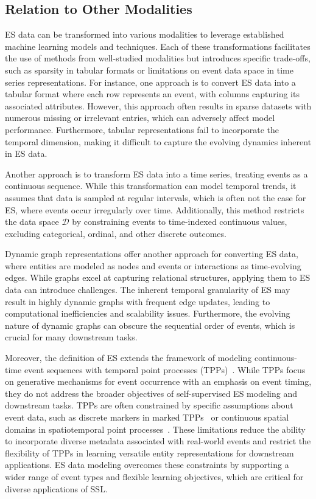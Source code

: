 \documentclass[twoside,11pt]{article}
\begin{document}
\subsection{Relation to Other Modalities}
\label{subsec:other-modality}
ES data can be transformed into various modalities to leverage established machine learning models and techniques. Each of these transformations facilitates the use of methods from well-studied modalities but introduces specific trade-offs, such as sparsity in tabular formats or limitations on event data space in time series representations. For instance, one approach is to convert ES data into a tabular format where each row represents an event, with columns capturing its associated attributes. However, this approach often results in sparse datasets with numerous missing or irrelevant entries, which can adversely affect model performance. Furthermore, tabular representations fail to incorporate the temporal dimension, making it difficult to capture the evolving dynamics inherent in ES data.

Another approach is to transform ES data into a time series, treating events as a continuous sequence. While this transformation can model temporal trends, it assumes that data is sampled at regular intervals, which is often not the case for ES, where events occur irregularly over time. Additionally, this method restricts the data space $\mathcal{D}$ by constraining events to time-indexed continuous values, excluding categorical, ordinal, and other discrete outcomes.

Dynamic graph representations offer another approach for converting ES data, where entities are modeled as nodes and events or interactions as time-evolving edges. While graphs excel at capturing relational structures, applying them to ES data can introduce challenges. The inherent temporal granularity of ES may result in highly dynamic graphs with frequent edge updates, leading to computational inefficiencies and scalability issues. Furthermore, the evolving nature of dynamic graphs can obscure the sequential order of events, which is crucial for many downstream tasks.

Moreover, the definition of ES extends the framework of modeling continuous-time event sequences with temporal point processes (TPPs)~. While TPPs focus on generative mechanisms for event occurrence with an emphasis on event timing, they do not address the broader objectives of self-supervised ES modeling and downstream tasks. TPPs are often constrained by specific assumptions about event data, such as discrete markers in marked TPPs~ or continuous spatial domains in spatiotemporal point processes~. These limitations reduce the ability to incorporate diverse metadata associated with real-world events and restrict the flexibility of TPPs in learning versatile entity representations for downstream applications. ES data modeling overcomes these constraints by supporting a wider range of event types and flexible learning objectives, which are critical for diverse applications of SSL.
\end{document}
